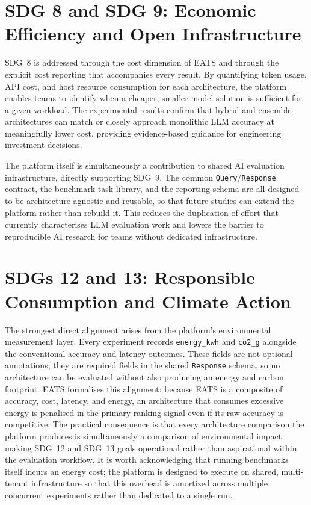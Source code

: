 \section*{SDG 8 and SDG 9: Economic Efficiency and Open Infrastructure}

SDG~8 is addressed through the cost dimension of EATS and through the explicit cost reporting
that accompanies every result.
By quantifying token usage, API cost, and host resource consumption for each architecture,
the platform enables teams to identify when a cheaper, smaller-model solution is sufficient for
a given workload.
The experimental results confirm that hybrid and ensemble architectures can match or closely
approach monolithic LLM accuracy at meaningfully lower cost, providing evidence-based guidance
for engineering investment decisions.

The platform itself is simultaneously a contribution to shared AI evaluation infrastructure,
directly supporting SDG~9.
The common \texttt{Query}/\texttt{Response} contract, the benchmark task library, and the
reporting schema are all designed to be architecture-agnostic and reusable, so that future
studies can extend the platform rather than rebuild it.
This reduces the duplication of effort that currently characterises LLM evaluation work and
lowers the barrier to reproducible AI research for teams without dedicated infrastructure.

\section*{SDGs 12 and 13: Responsible Consumption and Climate Action}

The strongest direct alignment arises from the platform's environmental measurement layer.
Every experiment records \texttt{energy\_kwh} and \texttt{co2\_g} alongside the conventional
accuracy and latency outcomes.
These fields are not optional annotations; they are required fields in the shared
\texttt{Response} schema, so no architecture can be evaluated without also producing an
energy and carbon footprint.
EATS formalises this alignment: because EATS is a composite of accuracy, cost, latency,
and energy, an architecture that consumes excessive energy is penalised in the primary
ranking signal even if its raw accuracy is competitive.
The practical consequence is that every architecture comparison the platform produces is
simultaneously a comparison of environmental impact, making SDG~12 and SDG~13 goals
operational rather than aspirational within the evaluation workflow.
It is worth acknowledging that running benchmarks itself incurs an energy cost; the platform
is designed to execute on shared, multi-tenant infrastructure so that this overhead is
amortized across multiple concurrent experiments rather than dedicated to a single run.

